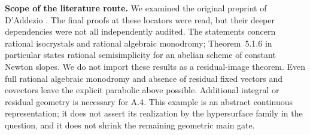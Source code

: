 \par\smallskip\noindent\textbf{Scope of the literature route.}
We examined the original preprint of D'Addezio
\cite[Theorem~4.4.12, printed pp.~23--24;
Proposition~5.1.4 and Theorem~5.1.6, printed p.~25]
{DAddezio2023Parabolicity}. The final proofs at these locators were
read, but their deeper dependencies were not all independently
audited. The statements concern rational isocrystals and rational
algebraic monodromy; Theorem~5.1.6 in particular states rational
semisimplicity for an abelian scheme of constant Newton slopes.
We do not import these results as a residual-image theorem. Even
full rational algebraic monodromy and absence of residual fixed
vectors and covectors leave the explicit parabolic above possible.
Additional integral or residual geometry is necessary for A.4.
This example is an abstract continuous representation; it does not
assert its realization by the hypersurface family in the question,
and it does not shrink the remaining geometric main gate.

